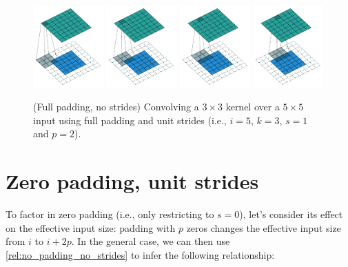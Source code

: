 \documentclass[notitlepage]{report}
\begin{document}
\begin{figure}[p]
    \centering
    \includegraphics[width=0.24\textwidth]{pdf/full_padding_no_strides_00.pdf}
    \includegraphics[width=0.24\textwidth]{pdf/full_padding_no_strides_01.pdf}
    \includegraphics[width=0.24\textwidth]{pdf/full_padding_no_strides_02.pdf}
    \includegraphics[width=0.24\textwidth]{pdf/full_padding_no_strides_03.pdf}
    \caption{\label{fig:full_padding_no_strides} (Full padding, no strides)
        Convolving a $3 \times 3$ kernel over a $5 \times 5$ input using full
        padding and unit strides (i.e., $i = 5$, $k = 3$, $s = 1$ and $p = 2$).}
\end{figure}

\section{Zero padding, unit strides}

To factor in zero padding (i.e., only restricting to $s = 0$), let's consider
its effect on the effective input size: padding with $p$ zeros changes the
effective input size from $i$ to $i + 2p$. In the general case, we can then use
\autoref{rel:no_padding_no_strides} to infer the following relationship:
\end{document}

